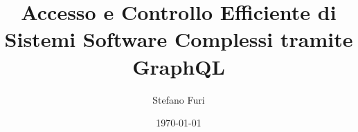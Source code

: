\documentclass[12pt,a4paper,openright,twoside]{book}
\title{Accesso e Controllo Efficiente di Sistemi Software Complessi tramite GraphQL}
\author{Stefano Furi}
\date{\today}
\begin{document}
\frontmatter\frontispiece


\tableofcontents   
\listoffigures     %
\lstlistoflistings %

\mainmatter








\backmatter




\end{document}
